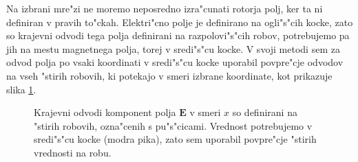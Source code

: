 \documentclass[12pt,twoside,openright,final]{report}
\renewcommand{\vec}{\mathbf}
\newcommand{\E}{\vec E}
\begin{document}
Na izbrani mre"zi ne moremo neposredno izra"cunati rotorja polj, ker ta ni definiran v pravih to"ckah. 
Elektri"cno polje je definirano na ogli"s"cih kocke, zato so krajevni odvodi tega polja definirani na razpolovi"s"cih robov, potrebujemo pa jih na mestu magnetnega polja, torej v sredi"s"cu kocke. 
V svoji metodi sem za odvod polja po vsaki koordinati v sredi"s"cu kocke uporabil povpre"cje odvodov na vseh "stirih robovih, ki potekajo v smeri izbrane koordinate, kot prikazuje slika \ref{fig:lattice-derivatives}. 

\begin{figure}[h]
\centering
 \caption{
 Krajevni odvodi komponent polja $\E$ v smeri $x$ so definirani na "stirih robovih, ozna"cenih s pu"s"cicami. 
 Vrednost potrebujemo v sredi"s"cu kocke (modra pika), zato sem uporabil povpre"cje "stirih vrednosti na robu. 
 }
 \label{fig:lattice-derivatives}
\end{figure}
\end{document}
